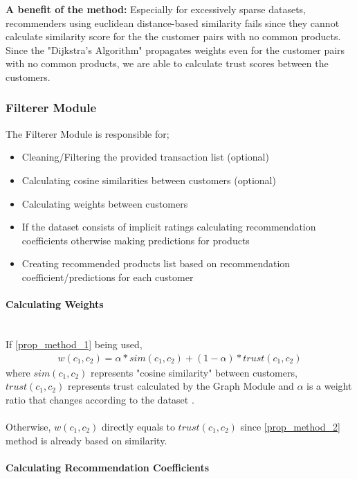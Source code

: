 	\textbf{A benefit of the method:} Especially for excessively sparse datasets, recommenders using euclidean distance-based similarity fails since they cannot calculate similarity score for the the customer pairs with no common products.	Since the  "Dijkstra's Algorithm" propagates weights even for the customer pairs with no common products, we are able to calculate trust scores between the customers.
	
	\subsubsection{Filterer Module} The Filterer Module is responsible for;
	\begin{itemize}
	\item Cleaning/Filtering the provided transaction list (optional)
	\item Calculating cosine similarities between customers (optional)
	\item Calculating weights between customers
	\item If the dataset consists of implicit ratings calculating recommendation coefficients otherwise making predictions for products
	\item Creating recommended products list based on recommendation coefficient/predictions for each customer
	\end{itemize}

	\paragraph{Calculating Weights} \mbox{}\\
	If \ref{prop_method_1} being used,
	\begin{equation*} 
	\begin{split}
		w(c_{1}, c_{2}) = \alpha*sim(c_{1},c_{2})+(1-\alpha)*trust(c_{1},c_{2})
	\end{split}
	\end{equation*}
	where $sim(c_{1},c_{2})$ represents "cosine similarity" between customers, $trust(c_{1},c_{2})$ represents trust calculated by the Graph Module and $\alpha$ is a weight ratio that changes according to the dataset .\\ \\
	Otherwise, $w(c_{1}, c_{2})$ directly equals to $trust(c_{1},c_{2})$ since \ref{prop_method_2} method is already based on similarity.

	\paragraph{Calculating Recommendation Coefficients}

